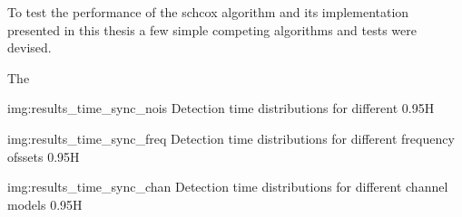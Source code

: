 To test the performance of the \acrlong{schcox} algorithm and
its implementation presented in this thesis a few
simple competing algorithms and tests were devised.

The

             {img:results_time_sync_nois}
             {Detection time distributions for different }
             {0.95}{H}

             {img:results_time_sync_freq}
             {Detection time distributions for different frequency ofssets}
             {0.95}{H}

             {img:results_time_sync_chan}
             {Detection time distributions for different channel models}
             {0.95}{H}
